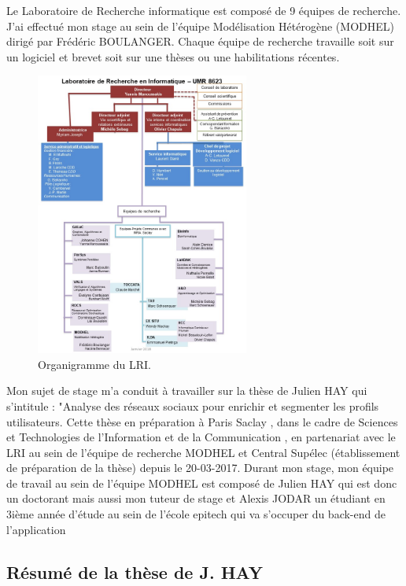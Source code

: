 Le Laboratoire de Recherche informatique est composé de 9 équipes de recherche. J'ai effectué mon stage au sein de l'équipe Modélisation Hétérogène (MODHEL) dirigé par Frédéric BOULANGER. Chaque équipe de recherche travaille soit sur un logiciel et brevet soit sur une thèses ou une habilitations récentes.

\begin{figure}[htp]
  \centering
  \includegraphics[width=7cm]{images/Orga_LRI}
  \caption{Organigramme du LRI.}
  \label{fig:une-autre-image}
\end{figure}

Mon sujet de stage m’a conduit à travailler sur la thèse de Julien HAY qui s'intitule : "Analyse des réseaux sociaux pour enrichir et segmenter les profils utilisateurs. Cette thèse en préparation à Paris Saclay , dans le cadre de Sciences et Technologies de l'Information et de la Communication , en partenariat avec le LRI au sein de l'équipe de recherche MODHEL et Central Supélec  (établissement de préparation de la thèse) depuis le 20-03-2017. Durant mon stage, mon équipe de travail au sein de l’équipe MODHEL est composé de Julien HAY qui est donc un doctorant mais aussi  mon tuteur de stage et Alexis JODAR un étudiant en 3ième année d’étude au sein de l’école epitech qui va s’occuper du back-end de l’application 


\subsection{Résumé de la thèse de J. HAY}

